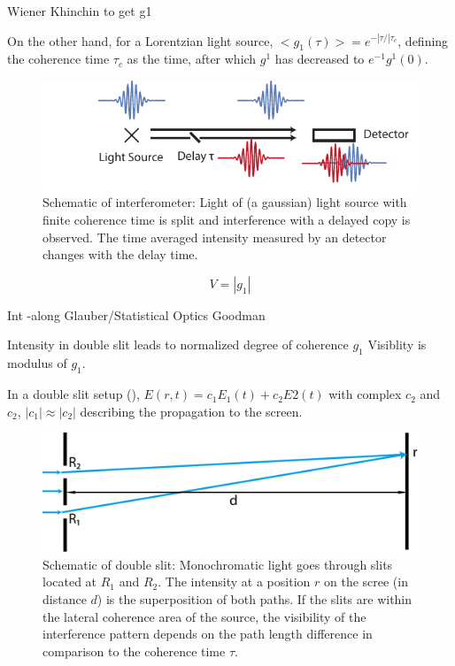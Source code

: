 Wiener Khinchin to get g1

On the other hand, for a Lorentzian light source, $<g_1(\tau)>=e^{-|\tau/| \tau_c}$, defining the coherence time $\tau_c$ as the time, after which $g^1$ has decreased to $e^{-1} g^1(0)$.

 \begin{figure}
	\centering
	\includegraphics[width=0.8\linewidth]{images/michelson.pdf}
	\caption[Schematic of interferometer]{Schematic of interferometer: Light of (a gaussian) light source with finite coherence time is split and interference with a delayed copy is observed. The time averaged intensity measured by an detector changes with the delay time. }
	\label{fig:michelson}
\end{figure}

\begin{equation}
V=\left|g_1\right|
\end{equation}

Int
-along Glauber/Statistical Optics Goodman



Intensity in double slit leads to normalized degree of coherence $g_1$
Visiblity is modulus of $g_1$.

In a double slit setup (), $E(r,t)=c_1 E_1(t)+c_2E2(t)$ with complex $c_2$ and $c_2$, $\left|c_1\right|\approx\left|c_2\right|$ describing the propagation to the screen. 

\begin{figure}
	\centering
	\includegraphics[width=0.8\linewidth]{images/doubleslit.pdf}
	\caption[Schematic of double slit]{Schematic of double slit: Monochromatic light goes through slits located at $R_1$ and $R_2$. The intensity at a position $r$ on the scree (in distance $d$) is the superposition of both paths.  If the slits are within the lateral coherence area of the source, the visibility of the interference pattern depends on the path length difference in comparison to the coherence time $\tau$.}
	\label{fig:doubleslit}
\end{figure}



